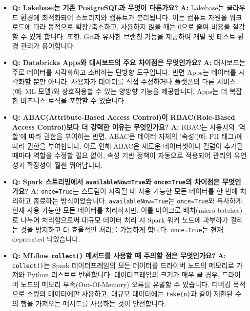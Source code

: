 \documentclass[11pt,a4paper]{article}
\theoremstyle{definition}
\begin{document}
\begin{itemize}
    \item \textbf{Q: Lakebase는 기존 PostgreSQL과 무엇이 다른가요?}
    \textbf{A:} Lakebase는 클라우드 환경에 최적화되어 스토리지와 컴퓨트가 분리됩니다. 이는 컴퓨트 자원을 워크로드에 따라 동적으로 확장/축소하고, 사용하지 않을 때는 0으로 줄여 비용을 절감할 수 있게 합니다. 또한, Git과 유사한 브랜칭 기능을 제공하여 개발 및 테스트 환경 관리가 용이합니다.

    \item \textbf{Q: Databricks Apps와 대시보드의 주요 차이점은 무엇인가요?}
    \textbf{A:} 대시보드는 주로 데이터를 시각화하고 소비하는 단방향 도구입니다. 반면 Apps는 데이터를 시각화할 뿐만 아니라, 사용자가 데이터를 직접 수정하거나 플랫폼의 다른 서비스(예: ML 모델)와 상호작용할 수 있는 양방향 기능을 제공합니다. Apps는 더 복잡한 비즈니스 로직을 포함할 수 있습니다.

    \item \textbf{Q: ABAC(Attribute-Based Access Control)이 RBAC(Role-Based Access Control)보다 더 강력한 이유는 무엇인가요?}
    \textbf{A:} RBAC는 사용자의 '역할'에 따라 권한을 부여하는 반면, ABAC은 데이터 자체의 '속성'(예: PII 태그)에 따라 권한을 부여합니다. 이로 인해 ABAC은 새로운 데이터셋이나 컬럼이 추가될 때마다 역할을 수정할 필요 없이, 속성 기반 정책이 자동으로 적용되어 관리의 유연성과 확장성이 훨씬 뛰어납니다.

    \item \textbf{Q: Spark 스트리밍에서 \texttt{availableNow=True}와 \texttt{once=True}의 차이점은 무엇인가요?}
    \textbf{A:} \texttt{once=True}는 스트림이 시작될 때 사용 가능한 모든 데이터를 한 번에 처리하고 종료하는 방식이었습니다. \texttt{availableNow=True}는 \texttt{once=True}와 유사하게 현재 사용 가능한 모든 데이터를 처리하지만, 이를 마이크로 배치(micro-batches)로 나누어 처리함으로써 대규모 데이터 처리 시 Spark 워커 노드에 과부하가 걸리는 것을 방지하고 더 효율적인 처리를 가능하게 합니다. \texttt{once=True}는 현재 deprecated 되었습니다.

    \item \textbf{Q: MLflow \texttt{collect()} 메서드를 사용할 때 주의할 점은 무엇인가요?}
    \textbf{A:} \texttt{collect()}는 Spark 데이터프레임의 모든 데이터를 드라이버 노드의 메모리로 가져와 Python 리스트로 반환합니다. 데이터프레임의 크기가 매우 클 경우, 드라이버 노드의 메모리 부족(Out-Of-Memory) 오류를 유발할 수 있습니다. 디버깅 목적으로 소량의 데이터에만 사용하고, 대규모 데이터에는 \texttt{take(n)}과 같이 제한된 수의 행을 가져오는 메서드를 사용하는 것이 안전합니다.
\end{itemize}
\end{document}
